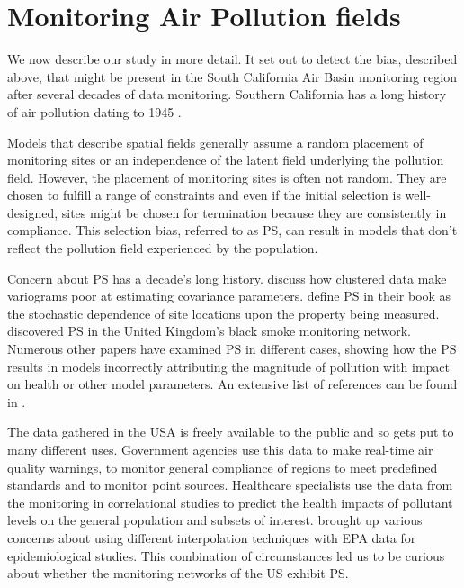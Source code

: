 \section{Monitoring Air Pollution fields} \label{sec:monitoring}
We now describe our study in more detail. It set out to detect the bias, described above, that might be present in the South California Air Basin monitoring region after several decades of data monitoring.  Southern California has a long history of air pollution dating to 1945 \citep{CASCAQMD:2015}.

Models that describe spatial fields generally assume a random placement of monitoring sites or an independence of the latent field underlying the pollution field.  However, the placement of monitoring sites is often not random. They are chosen to fulfill a range of constraints and even if the initial selection is well-designed, sites might be chosen for termination because they are consistently in compliance.  This selection bias, referred to as \ac{PS}, can result in models that don't reflect the pollution field experienced by the population. 

Concern about \ac{PS} has a decade's long history. \citet{isaaks1988spatial} discuss how clustered data make variograms poor at estimating covariance parameters. \cite{diggle:07} define \ac{PS} in their book as the stochastic dependence of site locations upon the property being measured. \cite{shaddick2012preferential} discovered  \ac{PS} in the United Kingdom's black smoke monitoring network. Numerous other papers have examined \ac{PS} in different cases, showing how the \ac{PS} results in models incorrectly attributing the magnitude of pollution with impact on health or other model parameters.  An extensive list of references can be found in \citep{Zidek:2012}.  

The data gathered in the USA is freely available to the public and so gets put to many different uses.  Government agencies use this data to make real-time air quality warnings, to monitor general compliance of regions to meet predefined standards and to monitor point sources.  Healthcare specialists use the data from the monitoring in correlational studies to predict the health impacts of pollutant levels on the general population and subsets of interest.  \cite{wong2004comparison} brought up various concerns about using different interpolation techniques with \ac{EPA} data for epidemiological studies.  This combination of circumstances led us to be curious about whether the monitoring networks of the US exhibit \ac{PS}.


